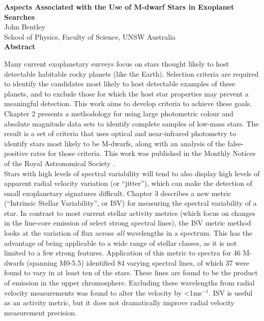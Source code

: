 \thispagestyle{plain}
\begin{center}
    \Large
    \textbf{Aspects Associated with the Use of M-dwarf Stars in Exoplanet Searches}\\
    \vspace{0.4cm}
    John Bentley\\
    School of Physics, Faculty of Science, UNSW Australia\\
    \vspace{0.9cm}
    \textbf{Abstract}
\end{center}
Many current exoplanetary surveys focus on stars thought likely to host detectable habitable rocky planets (like the Earth). Selection criteria are required to identify the candidates most likely to host detectable examples of these planets, and to exclude those for which the host star properties may prevent a meaningful detection. This work aims to develop criteria to achieve these goals.\\

Chapter 2 presents a methodology for using large photometric colour and absolute magnitude data sets to identify complete samples of low-mass stars. The result is a set of criteria that uses optical and near-infrared photometry to identify stars most likely to be M-dwarfs, along with an analysis of the false-positive rates for those criteria. This work was published in the Monthly Notices of the Royal Astronomical Society \citep{2019Bentley}.\\

Stars with high levels of spectral variability will tend to also display high levels of apparent radial velocity variation (or ``jitter''), which can make the detection of small exoplanetary signatures difficult.  Chapter 3 describes a new metric (``Intrinsic Stellar Variability'', or ISV) for measuring the spectral variability of a star. In contrast to most current stellar activity metrics (which focus on changes in the line-core emission of select strong spectral lines), the ISV metric method looks at the variation of flux across {\em all} wavelengths in a spectrum. This has the advantage of being applicable to a wide range of stellar classes, as it is not limited to a few strong features. Application of this metric to spectra for 46 M-dwarfs (spanning M0-5.5) identified 84 varying spectral lines, of which 37 were found to vary in at least ten of the stars. These lines are found to be the product of emission in the upper chromosphere. Excluding these wavelengths from radial velocity measurements was found to alter the velocity by \textless1ms$^{-1}$. ISV is useful as an activity metric, but it does not dramatically improve radial velocity measurement precision.\\

